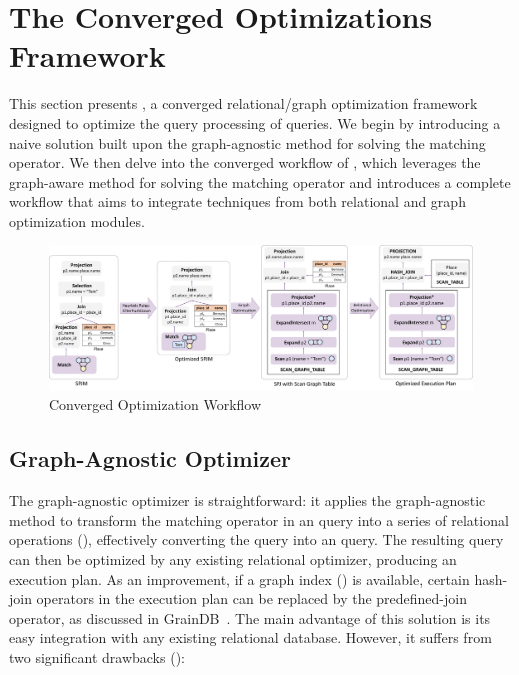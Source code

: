 \section{The Converged Optimizations Framework}
\label{sec:optimizations}

This section presents \name, a converged relational/graph optimization framework designed to optimize the query
processing of \spjm queries. We begin by introducing a naive solution built upon the graph-agnostic
method for solving the matching operator. We then delve into the converged workflow of \name, which leverages the graph-aware method for solving the matching operator and introduces a complete workflow that aims to integrate techniques from both relational and graph optimization modules.





\begin{figure}
    \centering
    \includegraphics[width=\linewidth]{./figures/workflow.pdf}
    \caption{Converged Optimization Workflow}
    \label{fig:framework-workflow}
\end{figure}


\subsection{Graph-Agnostic Optimizer}
\label{sec:relational-only}
The graph-agnostic optimizer is straightforward: it applies the graph-agnostic method to transform the matching operator in an \spjm query into a series of relational operations (), effectively converting the \spjm query into an \spj query. The resulting \spj query can then be optimized by any existing relational optimizer, producing an execution plan. As an improvement, if a graph index () is available, certain hash-join operators in the execution plan can be replaced by the predefined-join operator, as discussed in GrainDB~\cite{graindb}. The main advantage of this solution is its easy integration with any existing relational database. However, it suffers from two significant drawbacks ():

